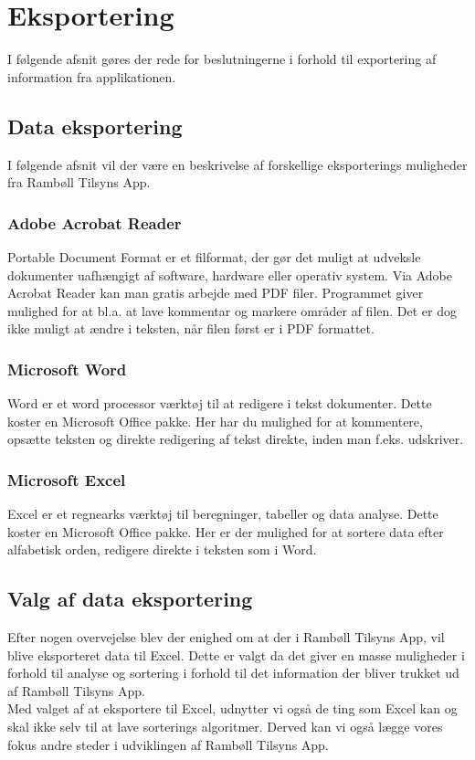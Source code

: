 \section{Eksportering}                                   
I følgende afsnit gøres der rede for beslutningerne i forhold til exportering af information fra applikationen.

\subsection{Data eksportering}
I følgende afsnit vil der være en beskrivelse af forskellige eksporterings muligheder fra Rambøll Tilsyns App.

\subsubsection{Adobe Acrobat Reader}
Portable Document Format\cite{PDF} er et filformat, der gør det muligt at udveksle dokumenter uafhængigt af software, hardware eller operativ system.
Via Adobe Acrobat Reader\cite{AdobeReader} kan man gratis arbejde med PDF filer. Programmet giver mulighed for at bl.a. at lave kommentar og markere områder af filen. Det er dog ikke muligt at ændre i teksten, når filen først er i PDF formattet.

\subsubsection{Microsoft Word}
Word\cite{Office} er et word processor\cite{WordProcessor} værktøj til at redigere i tekst dokumenter.
Dette koster en Microsoft Office pakke. Her har du mulighed for at kommentere, opsætte teksten og direkte redigering af tekst direkte, inden man f.eks. udskriver.

\subsubsection{Microsoft Excel}
Excel\cite{Office} er et regnearks værktøj til beregninger, tabeller og data analyse. 
Dette koster en Microsoft Office pakke. Her er der mulighed for at sortere data efter alfabetisk orden, redigere direkte i teksten som i Word.

\subsection{Valg af data eksportering}
Efter nogen overvejelse blev der enighed om at der i Rambøll Tilsyns App, vil blive eksporteret data til Excel. Dette er valgt da det giver en masse muligheder i forhold til analyse og sortering i forhold til det information der bliver trukket ud af Rambøll Tilsyns App. \\
Med valget af at eksportere til Excel, udnytter vi også de ting som Excel kan og skal ikke selv til at lave sorterings algoritmer. Derved kan vi også lægge vores fokus andre steder i udviklingen af Rambøll Tilsyns App.